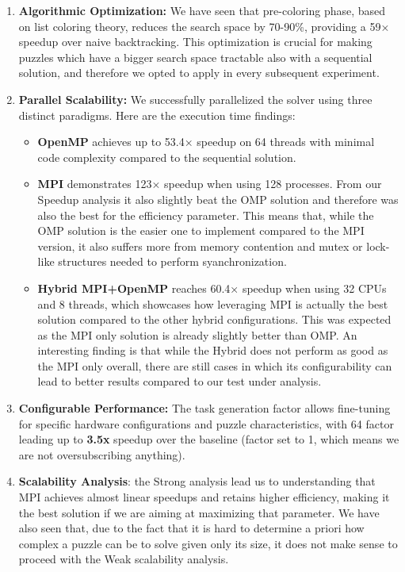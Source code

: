 \begin{enumerate}
    \item \textbf{Algorithmic Optimization:} We have seen that pre-coloring phase, based on list coloring theory, reduces the search space by 70-90\%, providing a 59× speedup over naive backtracking. This optimization is crucial for making puzzles which have a bigger search space tractable also with a sequential solution, and therefore we opted to apply in every subsequent experiment.
    
    \item \textbf{Parallel Scalability:} We successfully parallelized the solver using three distinct paradigms. Here are the execution time findings:
    \begin{itemize}
        \item \textbf{OpenMP} achieves up to 53.4× speedup on 64 threads with minimal code complexity compared to the sequential solution.
        \item \textbf{MPI} demonstrates 123× speedup when using 128 processes. From our Speedup analysis it also slightly beat the OMP solution and therefore was also the best for the efficiency parameter. This means that, while the OMP solution is the easier one to implement compared to the MPI version, it also suffers more from memory contention and mutex or lock-like structures needed to perform syanchronization.
        \item \textbf{Hybrid MPI+OpenMP} reaches 60.4× speedup when using 32 CPUs and 8 threads, which showcases how leveraging MPI is actually the best solution compared to the other hybrid configurations. This was expected as the MPI only solution is already slightly better than OMP. An interesting finding is that while the Hybrid does not perform as good as the MPI only overall, there are still cases in which its configurability can lead to better results compared to our test under analysis.
    \end{itemize}
    
    \item \textbf{Configurable Performance:} The task generation factor allows fine-tuning for specific hardware configurations and puzzle characteristics, with 64 factor leading up to \textbf{3.5x} speedup over the baseline (factor set to 1, which means we are not oversubscribing anything).

    \item \textbf{Scalability Analysis}: the Strong analysis lead us to understanding that MPI achieves almost linear speedups and retains higher efficiency, making it the best solution if we are aiming at maximizing that parameter. We have also seen that, due to the fact that it is hard to determine a priori how complex a puzzle can be to solve given only its size, it does not make sense to proceed with the Weak scalability analysis.
\end{enumerate}


